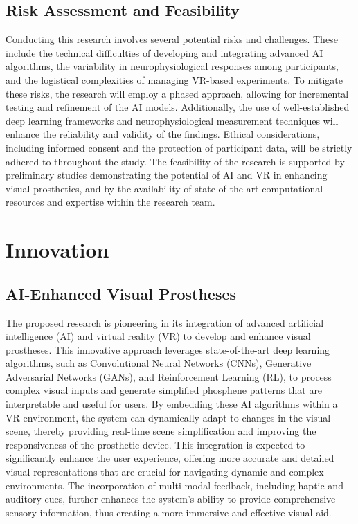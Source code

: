 \documentclass[10pt]{article}
\begin{document}
\subsection*{Risk Assessment and Feasibility}
Conducting this research involves several potential risks and challenges. These
include the technical difficulties of developing and integrating advanced AI
algorithms, the variability in neurophysiological responses among participants,
and the logistical complexities of managing VR-based experiments. To mitigate
these risks, the research will employ a phased approach, allowing for
incremental testing and refinement of the AI models. Additionally, the use of
well-established deep learning frameworks and neurophysiological measurement
techniques will enhance the reliability and validity of the findings. Ethical
considerations, including informed consent and the protection of participant
data, will be strictly adhered to throughout the study. The feasibility of the
research is supported by preliminary studies demonstrating the potential of AI
and VR in enhancing visual prosthetics, and by the availability of
state-of-the-art computational resources and expertise within the research team.

\section*{Innovation}\label{sec:innovation}
\subsection*{AI-Enhanced Visual Prostheses}
The proposed research is pioneering in its integration of advanced artificial intelligence (AI) and virtual reality (VR) to develop and enhance visual prostheses. This innovative approach leverages state-of-the-art deep learning algorithms, such as Convolutional Neural Networks (CNNs), Generative Adversarial Networks (GANs), and Reinforcement Learning (RL), to process complex visual inputs and generate simplified phosphene patterns that are interpretable and useful for users. By embedding these AI algorithms within a VR environment, the system can dynamically adapt to changes in the visual scene, thereby providing real-time scene simplification and improving the responsiveness of the prosthetic device. This integration is expected to significantly enhance the user experience, offering more accurate and detailed visual representations that are crucial for navigating dynamic and complex environments. The incorporation of multi-modal feedback, including haptic and auditory cues, further enhances the system's ability to provide comprehensive sensory information, thus creating a more immersive and effective visual aid.
\end{document}
